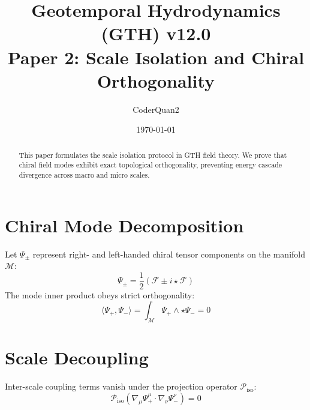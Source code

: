 \documentclass[11pt,a4paper]{article}
\title{\textbf{Geotemporal Hydrodynamics (GTH) v12.0\\Paper 2: Scale Isolation and Chiral Orthogonality}}
\author{CoderQuan2}
\date{\today}
\begin{document}
\maketitle
\begin{abstract}
This paper formulates the scale isolation protocol in GTH field theory. We prove that chiral field modes exhibit exact topological orthogonality, preventing energy cascade divergence across macro and micro scales.
\end{abstract}
\section{Chiral Mode Decomposition}
Let $\Psi_{\pm}$ represent right- and left-handed chiral tensor components on the manifold $\mathcal{M}$:
\begin{equation}
\Psi_{\pm} = \frac{1}{2}\left(\mathcal{F} \pm i \star \mathcal{F}\right)
\end{equation}
The mode inner product obeys strict orthogonality:
\begin{equation}
\langle \Psi_+, \Psi_- \rangle = \int_{\mathcal{M}} \Psi_+ \wedge \star \Psi_- = 0
\end{equation}
\section{Scale Decoupling}
Inter-scale coupling terms vanish under the projection operator $\mathcal{P}_{\text{iso}}$:
\begin{equation}
\mathcal{P}_{\text{iso}} \left( \nabla_\mu \Psi_+^\mu \cdot \nabla_\nu \Psi_-^\nu \right) = 0
\end{equation}
\end{document}
